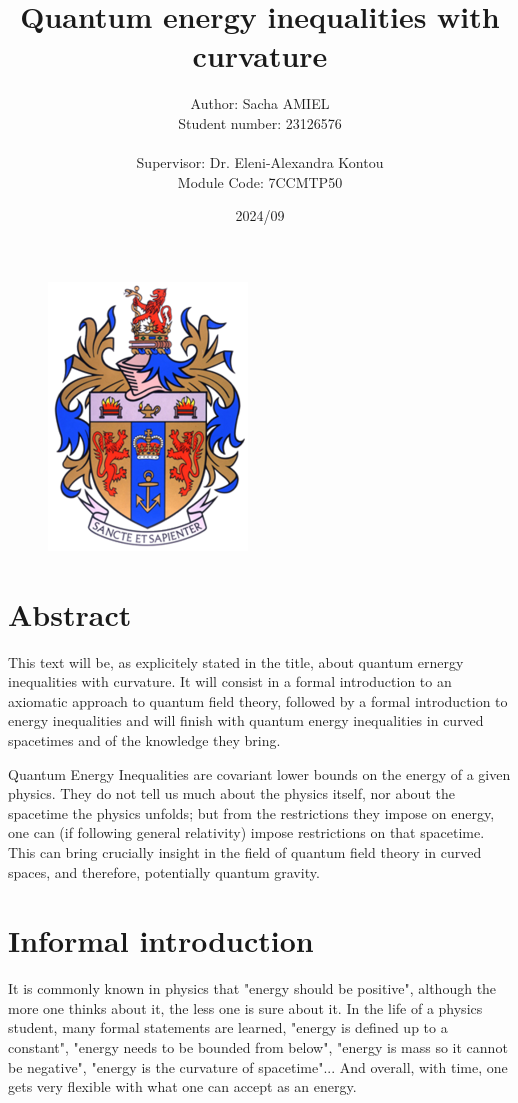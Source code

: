 \documentclass[a4paper,11pt]{article}
\title{Quantum energy inequalities with curvature}
\author{Author: Sacha AMIEL \\
Student number: 23126576\\
\\ Supervisor: Dr. Eleni-Alexandra Kontou \\ Module Code: 7CCMTP50}
\date{2024/09}
\numberwithin{equation}{section}
\theoremstyle{definition}
\begin{document}
\clearpage\maketitle
\thispagestyle{empty}
\begin{figure}[H]
    \centering
    \vspace{100mm}
    \includegraphics[width=0.2\columnwidth]{Template/kcl_logo.png}
\end{figure}

\newpage
\section*{Abstract}
This \color{red} text \color{black} will be, as explicitely stated in the title, about quantum ernergy inequalities with curvature. It will consist in a formal introduction to an axiomatic approach to quantum field theory, followed by a formal introduction to energy inequalities and will finish with quantum energy inequalities in curved spacetimes and of the knowledge they bring.

Quantum Energy Inequalities are covariant lower bounds on the energy of a given physics. They do not tell us much about the physics itself, nor about the spacetime the physics unfolds; but from the restrictions they impose on energy, one can (if following general relativity) impose restrictions on that spacetime. This can bring crucially insight in the field of quantum field theory in curved spaces, and therefore, potentially quantum gravity.

\section*{Informal introduction}
It is commonly known in physics that "energy should be positive", although the more one thinks about it, the less one is sure about it. In the life of a physics student, many formal statements are learned, "energy is defined up to a constant", "energy needs to be bounded from below", "energy is mass so it cannot be negative", "energy is the curvature of spacetime"... And overall, with time, one gets very flexible with what one can accept as an energy.
\end{document}
